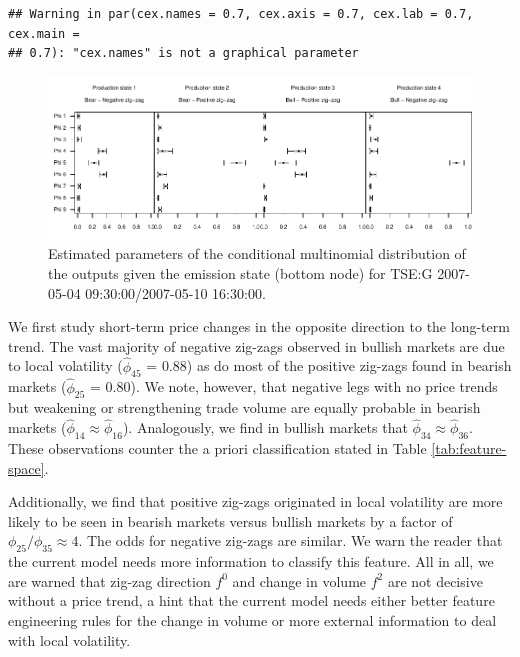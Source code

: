 \documentclass[]{article}
\begin{document}
\begin{verbatim}
## Warning in par(cex.names = 0.7, cex.axis = 0.7, cex.lab = 0.7, cex.main =
## 0.7): "cex.names" is not a graphical parameter
\end{verbatim}

\begin{figure}[H]
\includegraphics[width=\textwidth]{main_files/figure-latex/unnamed-chunk-11-1} \caption{Estimated parameters of the conditional multinomial distribution of the outputs given the emission state (bottom node) for TSE:G 2007-05-04 09:30:00/2007-05-10 16:30:00. \label{fig:tseg-ins-multinomial}}\label{fig:unnamed-chunk-11}
\end{figure}

We first study short-term price changes in the opposite direction to the
long-term trend. The vast majority of negative zig-zags observed in
bullish markets are due to local volatility (\(\hat{\phi}_{45}\) = 0.88)
as do most of the positive zig-zags found in bearish markets
(\(\hat{\phi}_{25}\) = 0.80). We note, however, that negative legs with
no price trends but weakening or strengthening trade volume are equally
probable in bearish markets
(\(\hat{\phi}_{14} \approx \hat{\phi}_{16}\)). Analogously, we find in
bullish markets that \(\hat{\phi}_{34} \approx \hat{\phi}_{36}\). These
observations counter the a priori classification stated in Table
\ref{tab:feature-space}.

Additionally, we find that positive zig-zags originated in local
volatility are more likely to be seen in bearish markets versus bullish
markets by a factor of \(\phi_{25} / \phi_{35} \approx 4\). The odds for
negative zig-zags are similar. We warn the reader that the current model
needs more information to classify this feature. All in all, we are
warned that zig-zag direction \(f^0\) and change in volume \(f^2\) are
not decisive without a price trend, a hint that the current model needs
either better feature engineering rules for the change in volume or more
external information to deal with local volatility.
\end{document}
